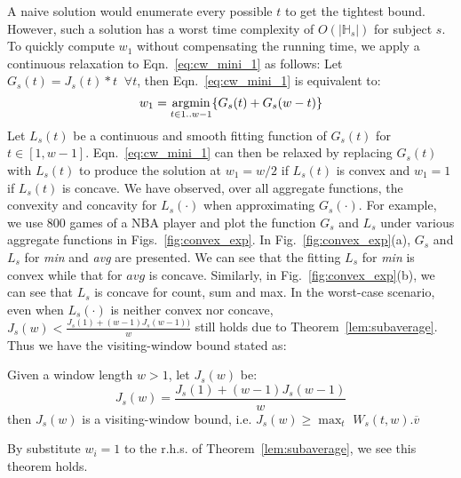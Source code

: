 A naive solution would enumerate every possible $t$ 
to get the tightest bound. However, such a solution 
has a worst time complexity of $O(|\mathbb{H}_s|)$ for subject $s$. 
To quickly compute $w_1$ without compensating the running time,
we apply a continuous relaxation to Eqn.~\ref{eq:cw_mini_1} as follows: 
Let $G_s(t) = J_s(t) * t \;\;\forall t$, 
then Eqn.~\ref{eq:cw_mini_1} is equivalent to:
\begin{equation}
\label{eq:cw_mini_2}
w_1 = \operatorname*{argmin}_{t\in 1..w-1} \{G_s(t) + G_s(w-t)\}
\end{equation}
Let $L_s(t)$ be a continuous and smooth fitting function 
of $G_s(t)$ for $t \in [1,w-1]$.  Eqn.~\ref{eq:cw_mini_1} can then be relaxed by replacing $G_s(t)$ with $L_s(t)$ to produce
the solution at $w_1=w/2$ if $L_s(t)$ is convex and $w_1=1$ 
if $L_s(t)$ is concave. We have observed, over all aggregate functions, the convexity and concavity for $L_s(\cdot)$
when approximating $G_s(\cdot)$. 
For example, we use 800 games of a NBA player and plot the 
function $G_s$ and $L_s$ under various aggregate functions in Figs.~\ref{fig:convex_exp}. 
In Fig.~\ref{fig:convex_exp}(a), $G_s$ and $L_s$ for \emph{min} and \emph{avg} are presented. 
We can see that the fitting $L_s$ for \emph{min} is convex while that for $avg$ is concave.
Similarly, in Fig.~\ref{fig:convex_exp}(b), 
we can see that $L_s$ is concave for count, sum and max. 
In the worst-case scenario, even when $L_s(\cdot)$ is neither convex nor concave, 
$J_s(w) < \frac{J_s(1) + (w-1)J_s(w - 1))}{w}$ still holds due to 
Theorem~\ref{lem:subaverage}. Thus we have the visiting-window bound stated as:

\begin{theorem}
\label{thm:visiting_window_bound}
Given a window length $w > 1$, let $J_s(w)$ be:
\begin{equation}
J_s(w) = \frac{J_s(1) + (w-1)J_s(w-1)}{w}
\end{equation}
then $J_s(w)$ is a visiting-window bound, i.e. $ J_s(w) \geq \max_t$ $W_s(t,w).\overline{v}$
\end{theorem}
By substitute $w_i = 1$ to the r.h.s. of Theorem~\ref{lem:subaverage}, we see this theorem holds. 

